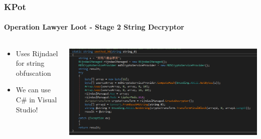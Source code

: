 \documentclass[aspectratio=169]{beamer}
\begin{document}
{
\begin{frame}
  \frametitle{KPot}
  \framesubtitle{Operation Lawyer Loot - Stage 2 String Decryptor}
  \begin{columns}
    \begin{column}{.3\textwidth}
      \begin{itemize}
      \item{Uses Rijndael for string obfuscation}
      \item{We can use C\# in Visual Studio!}
      \end{itemize}
    \end{column}
    \hfill
    \begin{column}{.7\textwidth}
      \begin{center}
        \includegraphics[scale=1.30]{kpot-unpacking-5}
      \end{center}
    \end{column}
  \end{columns}
\end{frame}
}
\end{document}

